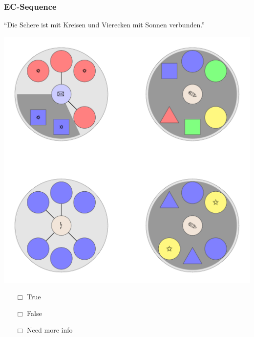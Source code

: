 \documentclass[fleqn,10pt,serif,xcolor=dvipsnames]{beamer}
\newcommand{\EC}{EC}
\newcommand{\mymark}[1]{{\color{blue}{#1}}}
\begin{document}
\begin{frame}
  \frametitle{\EC-Sequence}
  \begin{center}
    ``Die Schere ist mit Kreisen und Vierecken mit Sonnen verbunden.''

    \vspace{0.1cm}

    \includegraphics[width=0.5 \textwidth]{../../pictures/ec_01_3.pdf}

    \vspace{0.1cm}

    \begin{multicols}{3}
      \begin{itemize} 
      \item[$\Box$] True\\
        \onslide<2>{$\leadsto$  \mymark{false}}
      \item[$\Box$] False\\
        \onslide<2>{$\leadsto$ \mymark{EC}}
      \item[$\Box$] Need more info 
      \end{itemize}
    \end{multicols}

  \end{center}
\end{frame}
\end{document}
